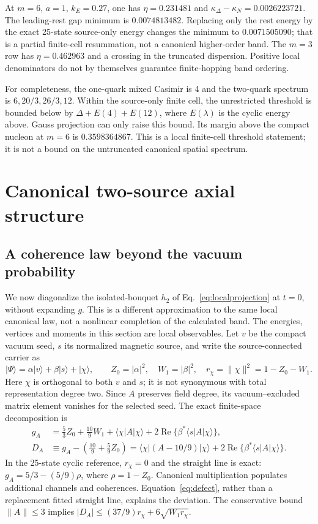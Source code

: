 \documentclass[11pt]{article}
\newcommand{\Rea}{\operatorname{Re}}
\newcommand{\ket}[1]{\lvert #1\rangle}
\newcommand{\bra}[1]{\langle #1\rvert}
\begin{document}
At $m=6$, $a=1$, $k_E=0.27$, one has $\eta=0.231481$ and $\kappa_\Delta-\kappa_N=0.0026223721$. The leading-rest gap minimum is $0.0074813482$. Replacing only the rest energy by the exact 25-state source-only energy changes the minimum to $0.0071505090$; that is a partial finite-cell resummation, not a canonical higher-order band. The $m=3$ row has $\eta=0.462963$ and a crossing in the truncated dispersion. Positive local denominators do not by themselves guarantee finite-hopping band ordering.

For completeness, the one-quark mixed Casimir is 4 and the two-quark spectrum is $6,20/3,26/3,12$. Within the source-only finite cell, the unrestricted threshold is bounded below by $\Delta+E(4)+E(12)$, where $E(\lambda)$ is the cyclic energy above. Gauss projection can only raise this bound. Its margin above the compact nucleon at $m=6$ is $0.3598364867$. This is a local finite-cell threshold statement; it is not a bound on the untruncated canonical spatial spectrum.

\section{Canonical two-source axial structure}
\subsection{A coherence law beyond the vacuum probability}
We now diagonalize the isolated-bouquet $h_2$ of Eq.~\eqref{eq:localprojection} at $t=0$, without expanding $g$. This is a different approximation to the same local canonical law, not a nonlinear completion of the calculated band. The energies, vertices and moments in this section are local observables. Let $v$ be the compact vacuum seed, $s$ its normalized magnetic source, and write the source-connected carrier as
\begin{equation}
 \ket\Psi=\alpha\ket v+\beta\ket s+\ket\chi,\qquad
 Z_0=|\alpha|^2,\quad W_1=|\beta|^2,\quad r_\chi=\|\chi\|^2=1-Z_0-W_1.
\end{equation}
Here $\chi$ is orthogonal to both $v$ and $s$; it is not synonymous with total representation degree two. Since $A$ preserves field degree, its vacuum--excluded matrix element vanishes for the selected seed. The exact finite-space decomposition is
\begin{align}
 g_A&=\frac53 Z_0+\frac{10}{9}W_1+\bra\chi A\ket\chi
            +2\Rea\{\beta^*\bra s A\ket\chi\},\\
 D_A&\equiv g_A-\left(\frac{10}{9}+\frac59 Z_0\right)
 =\bra\chi(A-10/9)\ket\chi+2\Rea\{\beta^*\bra s A\ket\chi\}. \label{eq:defect}
\end{align}
In the 25-state cyclic reference, $r_\chi=0$ and the straight line is exact: $g_A=5/3-(5/9)\rho$, where $\rho=1-Z_0$. Canonical multiplication populates additional channels and coherences. Equation~\eqref{eq:defect}, rather than a replacement fitted straight line, explains the deviation. The conservative bound $\|A\|\leq3$ implies $|D_A|\leq(37/9)r_\chi+6\sqrt{W_1r_\chi}$.
\end{document}
